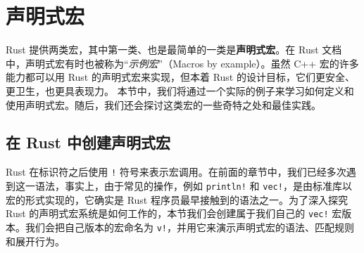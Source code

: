 \section{声明式宏}
\label{idx:idx_d781c718}
Rust 提供两类宏，其中第一类、也是最简单的一类是\textbf{声明式宏}。在 Rust 文档中，声明式宏有时也被称为“\emph{示例宏}”（Macros by example）。虽然 C++ 宏的许多能力都可以用 Rust 的声明式宏来实现，但本着 Rust 的设计目标，它们更安全、更卫生，也更具表现力。
\label{idx:idx_ed443b38}
本节中，我们将通过一个实际的例子来学习如何定义和使用声明式宏。随后，我们还会探讨这类宏的一些奇特之处和最佳实践。
\subsection{在 Rust 中创建声明式宏}
\label{idx:idx_aeefef60}
\label{idx:idx_e0109fa8}
Rust 在标识符之后使用 \texttt{!} 符号来表示宏调用。在前面的章节中，我们已经多次遇到这一语法，事实上，由于常见的操作，例如
\texttt{println!} 和 \texttt{vec!}，是由标准库以宏的形式实现的，它确实是 Rust 程序员最早接触到的语法之一。为了深入探究
Rust 的声明式宏系统是如何工作的，本节我们会创建属于我们自己的 \texttt{vec!} 宏版本。我们会把自己版本的宏命名为 \texttt{v!}，并用它来演示声明式宏的语法、匹配规则和展开行为。
